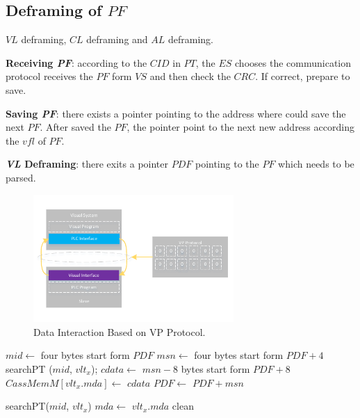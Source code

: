 \documentclass[journal,UTF8]{IEEEtran}
\begin{document}
\subsection{Deframing of $PF$}
 $VL$ deframing, $CL$ deframing and $AL$ deframing.

\textbf{Receiving \emph{PF}}: according to the $CID$ in $PT$, the $ES$ chooses the communication protocol receives the $PF$ form $VS$ and then check the $CRC$. If correct, prepare to save.

\textbf{Saving \emph{PF}}: there exists a pointer pointing to the address where could save the next $PF$. After saved the $PF$, the pointer point to the next new address according the $vfl$ of $PF$.

\textbf{\emph{VL} Deframing}: there exits a pointer $PDF$ pointing to the $PF$ which needs to be parsed.    

\begin{figure}
	\centering
	\includegraphics[width=3in]{fig/FlexibleLayer.pdf}
	\caption{ Data Interaction Based on VP Protocol.}
	\label{fig:FlexibleLayer}
\end{figure}
\begin{algorithm}
	\label{alg4}
	\caption{$VLDeframing$}%
    $mid \leftarrow$ four bytes start form $PDF$\;
    $msn \leftarrow$ four bytes start form $PDF+4$\; 
    searchPT ($mid$, $vlt_x$);
    $cdata \leftarrow$ $msn-8$ bytes start form $PDF+8$\;
	$CassMemM[vlt_x.mda]\leftarrow$ $cdata$\;
	$PDF\leftarrow$ $PDF+msn$\;
\end{algorithm}

\begin{algorithm}
	\label{alg5}
	\caption{$CLDeframing$}%
	searchPT($mid$, $vlt_x$)\;
	$mda\leftarrow$ $vlt_x.mda$\;
    clean\;
\end{algorithm}
\end{document}
